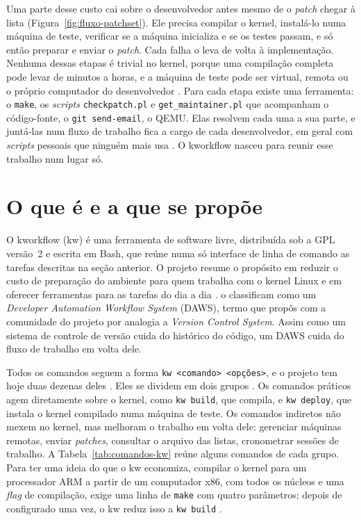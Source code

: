 Uma parte desse custo cai sobre o desenvolvedor antes mesmo de o
\textit{patch} chegar à lista (Figura~\ref{fig:fluxo-patchset}). Ele precisa
compilar o kernel, instalá-lo numa máquina de teste, verificar se a máquina
inicializa e se os testes passam, e só então preparar e enviar o
\textit{patch}. Cada falha o leva de volta à implementação. Nenhuma dessas
etapas é trivial no kernel, porque uma compilação completa pode levar de minutos a
horas, e a máquina de teste pode ser virtual, remota ou o próprio computador
do desenvolvedor \citep{tadokoro2025kw}. Para cada etapa existe uma
ferramenta: o \texttt{make}, os \textit{scripts} \texttt{checkpatch.pl} e
\texttt{get\_maintainer.pl} que acompanham o código-fonte, o \texttt{git
send-email}, o QEMU. Elas resolvem cada uma a sua parte, e juntá-las num fluxo
de trabalho fica a cargo de cada desenvolvedor, em geral com \textit{scripts}
pessoais que ninguém mais usa \citep{tadokoro2025kw}. O kworkflow nasceu para
reunir esse trabalho num lugar só.

\section{O que é e a que se propõe}
\label{sec:kw-o-que-e}

O kworkflow (kw) é uma ferramenta de software livre, distribuída sob a GPL
versão~2 e escrita em Bash, que reúne numa só interface de linha de comando as
tarefas descritas na seção anterior. O projeto resume o propósito em
reduzir o custo de preparação do ambiente para quem trabalha com o kernel
Linux e em oferecer ferramentas para as tarefas do dia a dia
\citep{kworkflowrepo}. \citet{tadokoro2025kw} o classificam como um
\textit{Developer Automation Workflow System} (DAWS), termo que
\citet{tadokoro2023lore} propôs com a comunidade do projeto por analogia a
\textit{Version Control System}. Assim como um sistema de controle de versão
cuida do histórico do código, um DAWS cuida do fluxo de trabalho em volta
dele.

Todos os comandos seguem a forma \texttt{kw <comando> <opções>}, e o projeto
tem hoje duas dezenas deles \citep{tadokoro2025kw}. Eles se dividem em dois
grupos \citep{tadokoro2023lore}. Os comandos práticos agem diretamente sobre o
kernel, como \texttt{kw build}, que compila, e \texttt{kw deploy}, que instala
o kernel compilado numa máquina de teste. Os comandos indiretos não mexem no
kernel, mas melhoram o trabalho em volta dele: gerenciar máquinas remotas,
enviar \textit{patches}, consultar o arquivo das listas, cronometrar sessões
de trabalho. A Tabela~\ref{tab:comandos-kw} reúne alguns comandos de cada
grupo. Para ter uma ideia do que o kw economiza, compilar o
kernel para um processador ARM a partir de um computador x86, com todos os
núcleos e uma \textit{flag} de compilação, exige uma linha de \texttt{make}
com quatro parâmetros; depois de configurado uma vez, o kw reduz isso a
\texttt{kw build} \citep{tadokoro2025kw}.

